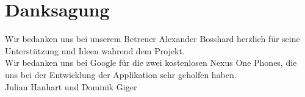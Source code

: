 \chapter*{Danksagung}
\thispagestyle{empty}
Wir bedanken uns bei unserem Betreuer Alexander Bosshard herzlich für seine Unterstützung und Ideen wahrend dem Projekt.\\

Wir bedanken uns bei Google für die zwei kostenlosen Nexus One Phones, die uns bei der Entwicklung der Applikation sehr geholfen haben. \\

Julian Hanhart und Dominik Giger


